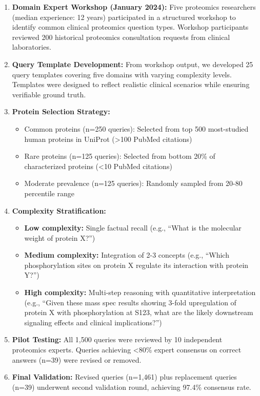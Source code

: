 \documentclass[11pt,a4paper]{article}
\begin{document}
\begin{enumerate}
    \item \textbf{Domain Expert Workshop (January 2024):} Five proteomics researchers (median experience: 12 years) participated in a structured workshop to identify common clinical proteomics question types. Workshop participants reviewed 200 historical proteomics consultation requests from clinical laboratories.

    \item \textbf{Query Template Development:} From workshop output, we developed 25 query templates covering five domains with varying complexity levels. Templates were designed to reflect realistic clinical scenarios while ensuring verifiable ground truth.

    \item \textbf{Protein Selection Strategy:}
    \begin{itemize}
        \item Common proteins (n=250 queries): Selected from top 500 most-studied human proteins in UniProt (>100 PubMed citations)
        \item Rare proteins (n=125 queries): Selected from bottom 20\% of characterized proteins (<10 PubMed citations)
        \item Moderate prevalence (n=125 queries): Randomly sampled from 20-80 percentile range
    \end{itemize}

    \item \textbf{Complexity Stratification:}
    \begin{itemize}
        \item \textbf{Low complexity:} Single factual recall (e.g., ``What is the molecular weight of protein X?'')
        \item \textbf{Medium complexity:} Integration of 2-3 concepts (e.g., ``Which phosphorylation sites on protein X regulate its interaction with protein Y?'')
        \item \textbf{High complexity:} Multi-step reasoning with quantitative interpretation (e.g., ``Given these mass spec results showing 3-fold upregulation of protein X with phosphorylation at S123, what are the likely downstream signaling effects and clinical implications?'')
    \end{itemize}

    \item \textbf{Pilot Testing:} All 1,500 queries were reviewed by 10 independent proteomics experts. Queries achieving <80\% expert consensus on correct answers (n=39) were revised or removed.

    \item \textbf{Final Validation:} Revised queries (n=1,461) plus replacement queries (n=39) underwent second validation round, achieving 97.4\% consensus rate.
\end{enumerate}
\end{document}
